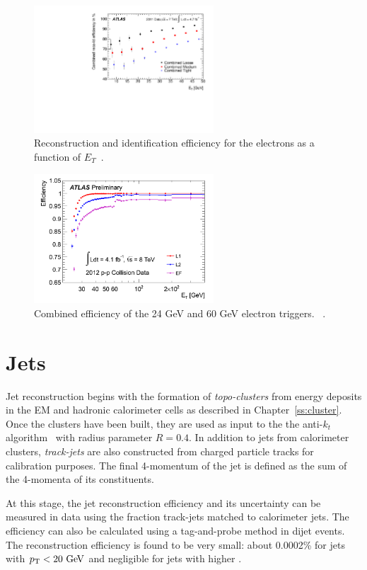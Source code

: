 \begin{figure}[hp]
\centering
\includegraphics[width=0.6\textwidth]{fig/obj/electronID.pdf}
\caption{Reconstruction and identification efficiency for the electrons as a function of $E_{T}$~\cite{Aad:2014fxa}.}
\label{fig:electronID}
\end{figure}
\begin{figure}[hp]
\centering
\includegraphics[width=0.6\textwidth]{fig/obj/eltrigger.png}
\caption{Combined efficiency of the 24 GeV and 60 GeV electron triggers. ~\cite{eltrig}.}
\label{fig:eltrigger}
\end{figure}

\section{Jets}
Jet reconstruction begins with the formation of \emph{topo-clusters} from energy deposits in the EM and hadronic calorimeter cells as described in Chapter~\ref{ss:cluster}. Once the clusters have been built, they are used as input to the the anti-$k_t$ algorithm~\cite{antikt1,antikt2,antikt3} with radius parameter $R=0.4$. In addition to jets from calorimeter clusters, \emph{track-jets} are also constructed from charged particle tracks for calibration purposes. The final 4-momentum of the jet is defined as the sum of the 4-momenta of its constituents. 

At this stage, the jet reconstruction efficiency and its uncertainty can be measured in data using the fraction track-jets matched to calorimeter jets. The efficiency can also be calculated using a tag-and-probe method in dijet events. The reconstruction efficiency is found to be very small: about 0.0002\% for jets with $\pt< 20 \gev$ and negligible for jets with higher \pt.

